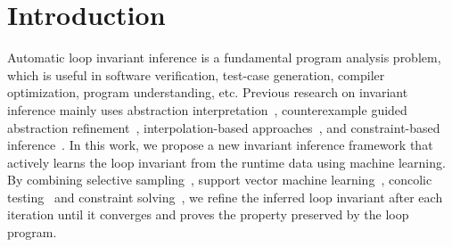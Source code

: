 
\section{Introduction} %
\label{sec:introduction}

Automatic loop invariant inference is a fundamental program analysis problem, 
which is useful in software verification, test-case generation, 
compiler optimization, program understanding, etc. 
Previous research on invariant inference mainly uses 
abstraction interpretation~\cite{cite}, 
counterexample guided abstraction refinement~\cite{cite}, 
interpolation-based approaches~\cite{cite}, 
and constraint-based inference~\cite{cite}. 
In this work, we propose a new invariant inference framework 
that actively learns the loop invariant from the runtime data using machine learning. 
By combining selective sampling~\cite{cite}, 
support vector machine learning~\cite{cite}, 
concolic testing~\cite{sen2007concolic} 
and constraint solving~\cite{cite}, 
we refine the inferred loop invariant after each iteration 
until it converges and proves the property preserved by the loop program. 

